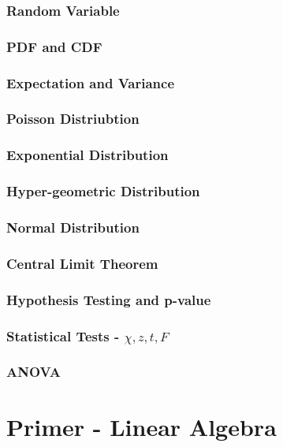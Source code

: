 \documentclass[12pt]{article}
\begin{document}
\subsubsection*{Random Variable}
\subsubsection*{PDF and CDF}
\subsubsection*{Expectation and Variance}
\subsubsection*{Poisson Distriubtion}
\subsubsection*{Exponential Distribution}
\subsubsection*{Hyper-geometric Distribution}
\subsubsection*{Normal Distribution}
\subsubsection*{Central Limit Theorem}
\subsubsection*{Hypothesis Testing and p-value}
\subsubsection*{Statistical Tests - $\chi, z, t, F$}
\subsubsection*{ANOVA}





\section{Primer - Linear Algebra}
\end{document}
